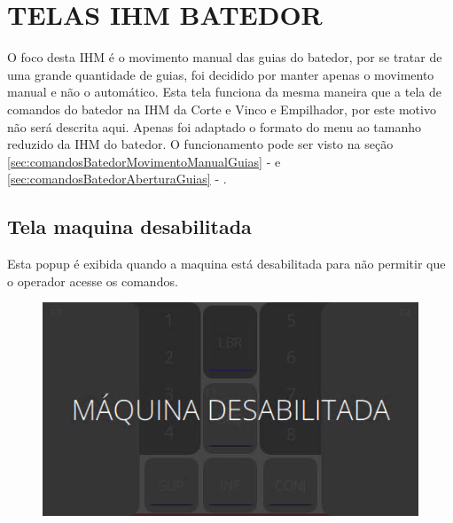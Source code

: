\thispagestyle{fancy}
\vspace*{40 pt}
\section{\large{\MakeUppercase{Telas IHM Batedor}}}
O foco desta IHM é o movimento manual das guias do batedor, por se tratar de uma grande quantidade de guias, foi decidido por manter apenas o movimento manual e não o automático.
Esta tela funciona da mesma maneira que a tela de comandos do batedor na IHM da Corte e Vinco e Empilhador, por este motivo não será descrita aqui. 
Apenas foi adaptado o formato do menu ao tamanho reduzido da IHM do batedor. O funcionamento pode ser visto na seção \ref{sec:comandosBatedorMovimentoManualGuias} - 
e \ref{sec:comandosBatedorAberturaGuias} - .

\subsection{Tela maquina desabilitada}
    Esta popup é exibida quando a maquina está desabilitada para não permitir que o operador acesse os comandos.
\vspace*{\fill}
\begin{figure}[h]
  \centering
  \includegraphics{src/imagesICV/12-KTP400-scout/e-1.png}
\end{figure}
\vspace*{\fill}

\newpage
\thispagestyle{fancy}
\vspace*{40 pt}
